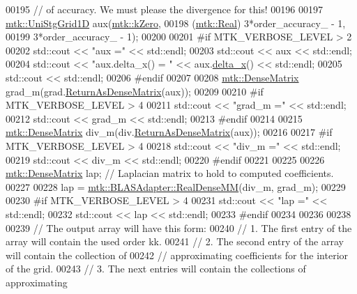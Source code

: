 \begin{DoxyCode}
00195   \textcolor{comment}{// of accuracy. We must please the divergence for this!}
00196 
00197   \hyperlink{classmtk_1_1UniStgGrid1D}{mtk::UniStgGrid1D} aux(\hyperlink{group__c01-roots_ga59a451a5fae30d59649bcda274fea271}{mtk::kZero},
00198                         (\hyperlink{group__c01-roots_gac080bbbf5cbb5502c9f00405f894857d}{mtk::Real}) 3*order\_accuracy\_ - 1,
00199                         3*order\_accuracy\_ - 1);
00200 
00201 \textcolor{preprocessor}{  #if MTK\_VERBOSE\_LEVEL > 2}
00202   std::cout << \textcolor{stringliteral}{"aux ="} << std::endl;
00203   std::cout << aux << std::endl;
00204   std::cout << \textcolor{stringliteral}{"aux.delta\_x() = "} << aux.\hyperlink{classmtk_1_1UniStgGrid1D_a6e7173b01241632cf509496d66b9f74c}{delta\_x}() << std::endl;
00205   std::cout << std::endl;
00206 \textcolor{preprocessor}{  #endif}
00207 
00208   \hyperlink{classmtk_1_1DenseMatrix}{mtk::DenseMatrix} grad\_m(grad.\hyperlink{classmtk_1_1Grad1D_a77b2eddbe4ab03f469306c604d505b1a}{ReturnAsDenseMatrix}(aux));
00209 
00210 \textcolor{preprocessor}{  #if MTK\_VERBOSE\_LEVEL > 4}
00211   std::cout << \textcolor{stringliteral}{"grad\_m ="} << std::endl;
00212   std::cout << grad\_m << std::endl;
00213 \textcolor{preprocessor}{  #endif}
00214 
00215   \hyperlink{classmtk_1_1DenseMatrix}{mtk::DenseMatrix} div\_m(div.\hyperlink{classmtk_1_1Div1D_a213fddbaaf86e4840c6a9649b69c2d49}{ReturnAsDenseMatrix}(aux));
00216 
00217 \textcolor{preprocessor}{  #if MTK\_VERBOSE\_LEVEL > 4}
00218   std::cout << \textcolor{stringliteral}{"div\_m ="} << std::endl;
00219   std::cout << div\_m << std::endl;
00220 \textcolor{preprocessor}{  #endif}
00221 
00225 
00226   \hyperlink{classmtk_1_1DenseMatrix}{mtk::DenseMatrix} lap; \textcolor{comment}{// Laplacian matrix to hold to computed coefficients.}
00227 
00228   lap = \hyperlink{classmtk_1_1BLASAdapter_acebd0e9bfe0bdd609c7fbea98ccfd3b5}{mtk::BLASAdapter::RealDenseMM}(div\_m, grad\_m);
00229 
00230 \textcolor{preprocessor}{  #if MTK\_VERBOSE\_LEVEL > 4}
00231   std::cout << \textcolor{stringliteral}{"lap ="} << std::endl;
00232   std::cout << lap << std::endl;
00233 \textcolor{preprocessor}{  #endif}
00234 
00236 
00238 
00239   \textcolor{comment}{// The output array will have this form:}
00240   \textcolor{comment}{// 1. The first entry of the array will contain the used order kk.}
00241   \textcolor{comment}{// 2. The second entry of the array will contain the collection of}
00242   \textcolor{comment}{// approximating coefficients for the interior of the grid.}
00243   \textcolor{comment}{// 3. The next entries will contain the collections of approximating}

\end{DoxyCode}
